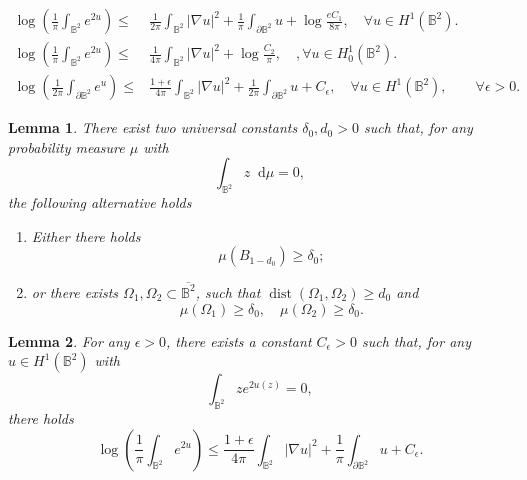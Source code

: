 \documentclass[10pt,a4paper]{amsart}
\newtheorem{lemma}{Lemma}
\newcommand{\dd}{\mathop{}\!\mathrm{d}}
\begin{document}
    \begin{align}
        \log\left(
        \frac{1}{\pi}\int_{\mathbb{B}^2}e^{2u}
        \right)
        \leq& \frac{1}{2\pi}\int_{\mathbb{B}^2}
        |\nabla u|^2
        +\frac{1}{\pi}
        \int_{\partial\mathbb{B}^2} u
        +\log\frac{eC_1}{8\pi},\quad 
        \forall u\in H^1(\mathbb{B}^2).
        \label{eq. weak Moser on ball}
        \\[3mm]
        \log\left(
        \frac{1}{\pi}\int_{\mathbb{B}^2}e^{2u}
        \right)
        \leq& \frac{1}{4\pi}\int_{\mathbb{B}^2}
        |\nabla u|^2+\log\frac{C_2}{\pi},\quad,\forall u\in H_0^1(\mathbb{B}^2).
        \label{eq. weak Moser for Dirichlet boundary value}
        \\[3mm]
        \log\left(
        \frac{1}{2\pi}
        \int_{\partial \mathbb{B}^2}e^{u}
        \right)
        \leq& \frac{1+\epsilon}{4\pi}\int_{\mathbb{B}^2}
        |\nabla u|^2
        +\frac{1}{2\pi}
        \int_{\partial\mathbb{B}^2} u
        +C_\epsilon,\quad \forall u\in H^1(\mathbb{B}^2),\qquad \forall \epsilon>0.\label{eq. weak LMO inequality}
    \end{align}

    \begin{lemma}\label{lem. concentration for measures}
        There exist two universal constants $\delta_0, d_0>0$ such that, for any probability measure $\mu$ with 
        \[
        \int_{\mathbb{B}^2}z\dd \mu=0,
        \]
        the following alternative holds
        \begin{enumerate}
            \item Either there holds
            \[
            \mu(B_{1-d_0})\geq \delta_0;
            \]
            \item or there exists $\Omega_1,\Omega_2\subset \overline{\mathbb{B}^2}$, such that $\operatorname{dist}(\Omega_1,\Omega_2)\geq d_0$ and
            \[
            \mu(\Omega_1)\geq \delta_0,
            \quad 
            \mu(\Omega_2)\geq \delta_0.
            \]
        \end{enumerate}
    \end{lemma}

    \begin{lemma}\label{lem. improved weak Moser on ball}
        For any $\epsilon>0$, there exists a constant $C_\epsilon>0$ such that, for any $u\in H^1(\mathbb{B}^2)$ with 
        \[
        \int_{\mathbb{B}^2}ze^{2u(z)}=0,
        \]
        there holds
        \[
        \log\left(
        \frac{1}{\pi}\int_{\mathbb{B}^2}e^{2u}
        \right)
        \leq \frac{1+\epsilon}{4\pi}\int_{\mathbb{B}^2}
        |\nabla u|^2
        +\frac{1}{\pi}
        \int_{\partial\mathbb{B}^2} u
        +C_\epsilon.
        \]
    \end{lemma}
\end{document}
